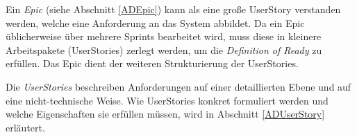 Ein \textit{Epic} (siehe Abschnitt \ref{ADEpic}) kann als eine große UserStory verstanden werden, welche eine Anforderung an das System abbildet. Da ein Epic üblicherweise über mehrere Sprints bearbeitet wird, muss diese in kleinere Arbeitspakete (UserStories) zerlegt werden, um die \textit{Definition of Ready} zu erfüllen. Das Epic dient der weiteren Strukturierung der UserStories.

Die \textit{UserStories} beschreiben Anforderungen auf einer detaillierten Ebene und auf eine nicht-technische Weise. Wie UserStories konkret formuliert werden und welche Eigenschaften sie erfüllen müssen, wird in Abschnitt \ref{ADUserStory} erläutert.


